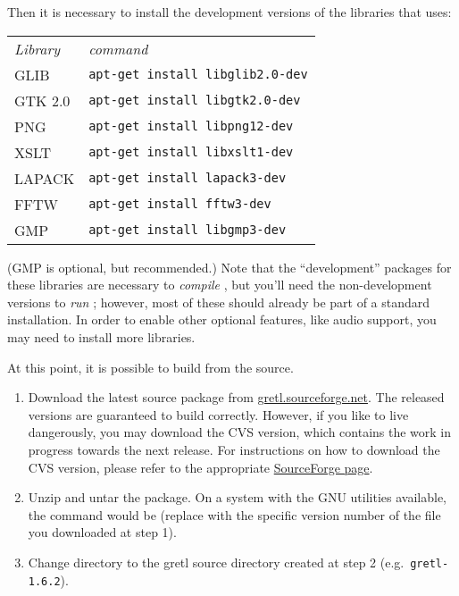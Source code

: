Then it is necessary to install the development versions of the
libraries that  uses:

\begin{center}
  \begin{tabular}{ll}
    \textit{Library} & \textit{command} \\ [4pt]
    GLIB & \texttt{apt-get install libglib2.0-dev} \\
    GTK 2.0 & \texttt{apt-get install libgtk2.0-dev} \\
    PNG & \texttt{apt-get install libpng12-dev} \\
    XSLT & \texttt{apt-get install libxslt1-dev} \\
    LAPACK & \texttt{apt-get install lapack3-dev} \\
    FFTW & \texttt{apt-get install fftw3-dev} \\
    GMP & \texttt{apt-get install libgmp3-dev}
  \end{tabular}
\end{center}

(GMP is optional, but recommended.)  Note that the ``development''
packages for these libraries are necessary to \emph{compile}
, but you'll need the non-development versions to
\emph{run} ; however, most of these should already be part
of a standard installation. In order to enable other optional
features, like audio support, you may need to install more libraries.

At this point, it is possible to build from the source.
\begin{enumerate}
\item Download the latest  source package from
  \href{http://gretl.sourceforge.net/}{gretl.sourceforge.net}.
  The released versions are guaranteed to build correctly. However, if
  you like to live dangerously, you may download the CVS version,
  which contains the work in progress towards the next release. For
  instructions on how to download the CVS version, please refer to the
  appropriate
  \href{http://sourceforge.net/docman/display_doc.php?docid=14035&group_id=1}{SourceForge page}.
\item Unzip and untar the package.  On a system with the GNU utilities
  available, the command would be 
  (replace  with the specific version number of the file you
  downloaded at step 1).
\item Change directory to the gretl source directory created at step 2
  (e.g.\ \verb+gretl-1.6.2+).
\end{enumerate}
          
